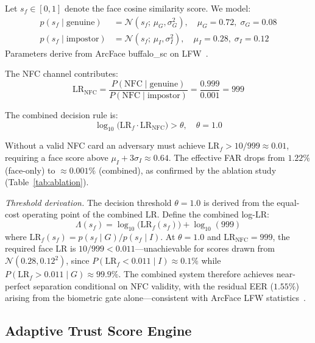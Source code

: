 \documentclass[pdflatex,sn-vancouver-num]{sn-jnl}%
\theoremstyle{thmstyleone}%
\theoremstyle{thmstyletwo}%
\theoremstyle{thmstylethree}%
\begin{document}
Let \(s_f \in [0,1]\) denote the face cosine similarity score. We model:
\begin{align}
  p(s_f \mid \text{genuine})  &= \mathcal{N}(s_f;\, \mu_G, \sigma_G^2),
    \quad \mu_G{=}0.72,\; \sigma_G{=}0.08 \\
  p(s_f \mid \text{impostor}) &= \mathcal{N}(s_f;\, \mu_I, \sigma_I^2),
    \quad \mu_I{=}0.28,\; \sigma_I{=}0.12
\end{align}
Parameters derive from ArcFace buffalo\_sc on LFW~\cite{deng2019arcface}.

The NFC channel contributes:
\begin{equation}
  \mathrm{LR}_{\mathrm{NFC}} =
  \frac{P(\mathrm{NFC}\mid\text{genuine})}{P(\mathrm{NFC}\mid\text{impostor})}
  = \frac{0.999}{0.001} = 999
\end{equation}

The combined decision rule is:
\begin{equation}
  \log_{10}\!\bigl(\mathrm{LR}_f \cdot \mathrm{LR}_{\mathrm{NFC}}\bigr) >
  \theta, \quad \theta = 1.0
\end{equation}

Without a valid NFC card an adversary must achieve
\(\mathrm{LR}_f > 10/999 \approx 0.01\), requiring a face score above
\(\mu_I + 3\sigma_I \approx 0.64\). The effective FAR drops from
\(1.22\%\) (face-only) to \(\approx 0.001\%\) (combined), as confirmed by
the ablation study (Table~\ref{tab:ablation}).

\textit{Threshold derivation.} The decision threshold \(\theta=1.0\) is
derived from the equal-cost operating point of the combined LR. Define the
combined log-LR:
\begin{equation}
  \Lambda(s_f) = \log_{10}\!\bigl(\mathrm{LR}_f(s_f)\bigr)
               + \log_{10}(999)
\end{equation}
where \(\mathrm{LR}_f(s_f) = p(s_f\mid G)/p(s_f\mid I)\). At
\(\theta{=}1.0\) and \(\mathrm{LR}_{\mathrm{NFC}}{=}999\), the required face
LR is \(10/999 < 0.011\)---unachievable for scores drawn from
\(\mathcal{N}(0.28, 0.12^2)\), since \(P(\mathrm{LR}_f < 0.011 \mid I)
\approx 0.1\%\) while \(P(\mathrm{LR}_f > 0.011 \mid G) \approx 99.9\%\).
The combined system therefore achieves near-perfect separation conditional on
NFC validity, with the residual EER (\(1.55\%\)) arising from the biometric
gate alone---consistent with ArcFace LFW statistics~\cite{deng2019arcface}.

\subsection{Adaptive Trust Score Engine}\label{sec:ats}
\end{document}
